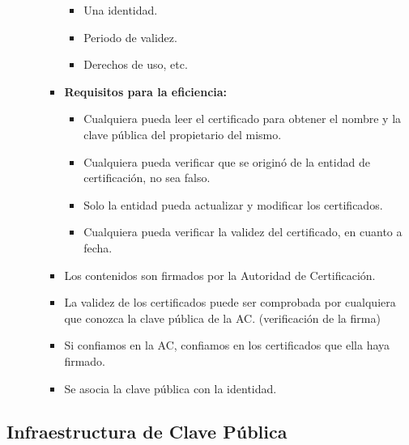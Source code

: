 \documentclass[12pt, twoside, openright]{report} %
\begin{document}
\begin{itemize}
\begin{itemize}
\begin{itemize}
        \begin{itemize}
        \item Una identidad.
          
        \item Periodo de validez.
          
        \item Derechos de uso, etc.
          
        \end{itemize}
      \item \textbf{Requisitos para la eficiencia:}
        

        \begin{itemize}
        \item Cualquiera pueda leer el certificado para obtener el nombre y
          la clave pública del propietario del mismo.
          
        \item Cualquiera pueda verificar que se originó de la entidad de
          certificación, no sea falso.
          
        \item Solo la entidad pueda actualizar y modificar los certificados.
          
        \item Cualquiera pueda verificar la validez del certificado, en
          cuanto a fecha.
          
        \end{itemize}
      \item Los contenidos son firmados por la Autoridad de Certificación.
        
      \item La validez de los certificados puede ser comprobada por
        cualquiera que conozca la clave pública de la AC. (verificación
        de la firma)
        
      \item Si confiamos en la AC, confiamos en los certificados que ella
        haya firmado.
        
      \item Se asocia la clave pública con la identidad.
        
      \end{itemize}
    \end{itemize}
  \end{itemize}

  
  \subsection{Infraestructura de Clave Pública}
  
\end{document}
